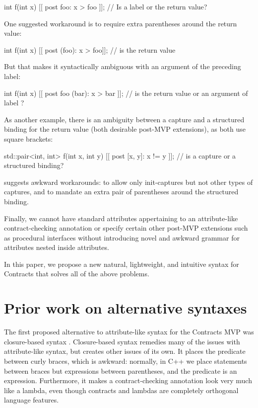\begin{codeblock}
int f(int x)
  [[ post foo: x > foo ]];   // Is  a label or the return value?
\end{codeblock}

One suggested workaround is to require extra parentheses around the return value:

\begin{codeblock}
int f(int x)
  [[ post (foo): x > foo]];   //  is the return value
\end{codeblock}


But that makes it syntactically ambiguous with an argument of the preceding label:
\begin{codeblock}
int f(int x)
  [[ post foo (bar): x > bar ]];   // is  the return value or an argument of label ?
\end{codeblock}

 As another example, there is an ambiguity between a capture and a structured binding for the return value (both desirable post-MVP extensions), as both use square brackets:
 
\begin{codeblock}
std::pair<int, int> f(int x, int y)
  [[ post [x, y]: x != y ]];   // is \tcode{[x, y]} a capture or a structured binding?
\end{codeblock}
 
\cite{P2935R3} suggests awkward workarounds:  to allow only init-captures but not other types of captures, and to mandate an extra pair of parentheses around the structured binding. 

Finally, we cannot have standard attributes appertaining to an attribute-like contract-checking annotation or specify certain other post-MVP extensions such as procedural interfaces without introducing novel and awkward grammar for attributes nested inside attributes.

In this paper, we propose a new natural, lightweight, and intuitive syntax for Contracts that solves all of the above problems.
 

\section{Prior work on alternative syntaxes}

The first proposed alternative to attribute-like syntax for the Contracts MVP was closure-based syntax \cite{P2461R1}. Closure-based syntax remedies many of the issues with attribute-like syntax, but creates other issues of its own. It places the predicate between curly braces, which is awkward: normally, in C++ we place statements between braces but expressions between parentheses, and the predicate is an expression. Furthermore, it makes a contract-checking annotation look very much like a lambda, even though contracts and lambdas are completely orthogonal language features.

